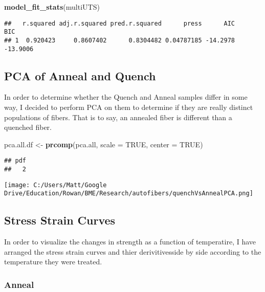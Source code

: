 \documentclass[]{article}
\newenvironment{Shaded}{\begin{snugshade}}{\end{snugshade}}
\newcommand{\DataTypeTok}[1]{\textcolor[rgb]{0.13,0.29,0.53}{#1}}
\newcommand{\KeywordTok}[1]{\textcolor[rgb]{0.13,0.29,0.53}{\textbf{#1}}}
\newcommand{\NormalTok}[1]{#1}
\newcommand{\OtherTok}[1]{\textcolor[rgb]{0.56,0.35,0.01}{#1}}
\newcommand{\StringTok}[1]{\textcolor[rgb]{0.31,0.60,0.02}{#1}}
\begin{document}
\begin{Shaded}
\begin{Highlighting}[]
\KeywordTok{model_fit_stats}\NormalTok{(multiUTS)}
\end{Highlighting}
\end{Shaded}

\begin{verbatim}
##   r.squared adj.r.squared pred.r.squared      press      AIC      BIC
## 1  0.920423     0.8607402      0.8304482 0.04787185 -14.2978 -13.9006
\end{verbatim}

\hypertarget{pca-of-anneal-and-quench}{%
\subsection{PCA of Anneal and Quench}\label{pca-of-anneal-and-quench}}

In order to determine whether the Quench and Anneal samples differ in
some way, I decided to perform PCA on them to determine if they are
really distinct populations of fibers. That is to say, an annealed fiber
is different than a quenched fiber.

\begin{Shaded}
\begin{Highlighting}[]
\NormalTok{pca.all.df  <-}\StringTok{ }\KeywordTok{prcomp}\NormalTok{(pca.all, }\DataTypeTok{scale =} \OtherTok{TRUE}\NormalTok{, }\DataTypeTok{center =} \OtherTok{TRUE}\NormalTok{)}
\end{Highlighting}
\end{Shaded}

\begin{verbatim}
## pdf 
##   2
\end{verbatim}

\texttt{[image: C:/Users/Matt/Google Drive/Education/Rowan/BME/Research/autofibers/quenchVsAnnealPCA.png]}

\hypertarget{stress-strain-curves}{%
\subsection{Stress Strain Curves}\label{stress-strain-curves}}

In order to visualize the changes in strength as a function of
temperatire, I have arranged the stress strain curves and thier
derivitivesside by side according to the temperature they were treated.

\hypertarget{anneal}{%
\subsubsection{Anneal}\label{anneal}}
\end{document}
